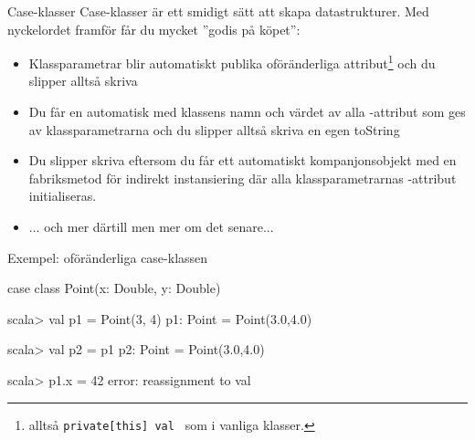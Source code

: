 

\begin{Slide}{Case-klasser}
Case-klasser är ett smidigt sätt att skapa  datastrukturer. Med nyckelordet  framför  får du mycket ''godis på köpet'':

\begin{itemize}
\item Klassparametrar blir automatiskt publika oföränderliga attribut\footnote{alltså  \texttt{private[this] val } som i vanliga klasser.} och du slipper alltså skriva 
\item Du får en automatisk  med klassens namn och värdet av alla -attribut som ges av klassparametrarna och du slipper alltså skriva en egen toString
\item Du slipper skriva  eftersom du får ett automatiskt kompanjonsobjekt med en fabriksmetod  för indirekt instansiering där alla klassparametrarnas -attribut initialiseras.
\pause
\item ... och mer därtill men mer om det senare...
\end{itemize}
\end{Slide}




\begin{Slide}{Exempel: oföränderliga case-klassen }

\begin{Code}[basicstyle=\SlideFontSize{10}{12}\ttfamily]
case class Point(x: Double, y: Double)
\end{Code}

\begin{REPLnonum}
scala> val p1 = Point(3, 4)
p1: Point = Point(3.0,4.0)

scala> val p2 = p1
p2: Point = Point(3.0,4.0)

scala> p1.x = 42
error: reassignment to val
\end{REPLnonum}

\end{Slide}









